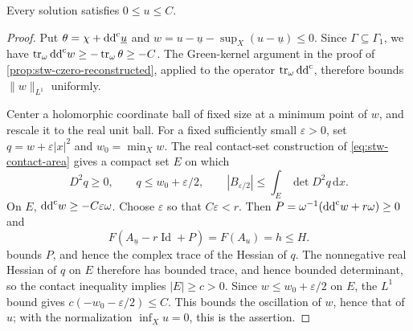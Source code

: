 \begin{proposition}\label{prop:strict-gap-potential-bound}
Every solution satisfies $0\leq u\leq C$.
\end{proposition}
\begin{proof}
Put $\theta=\chi+\mathrm{dd}^{\mathrm{c}}\underline u$ and $w=u-\underline u-\sup_X(u-\underline u)\leq0$. Since $\Gamma\subseteq\Gamma_1$, we have $\operatorname{tr}_\omega\mathrm{dd}^{\mathrm{c}} w\geq-\operatorname{tr}_\omega\theta\geq-C$. The Green-kernel argument in the proof of \cref{prop:stw-czero-reconstructed}, applied to the operator $\operatorname{tr}_\omega\mathrm{dd}^{\mathrm{c}}$, therefore bounds $\|w\|_{L^1}$ uniformly.

Center a holomorphic coordinate ball of fixed size at a minimum point of $w$, and rescale it to the real unit ball. For a fixed sufficiently small $\varepsilon>0$, set $q=w+\varepsilon|x|^2$ and $w_0=\min_Xw$. The real contact-set construction of \eqref{eq:stw-contact-area} gives a compact set $E$ on which
\[
 D^2q\geq0,\qquad q\leq w_0+\varepsilon/2,
 \qquad |B_{\varepsilon/2}|\leq\int_E\det D^2q\,\mathrm dx.
\]
On $E$, $\mathrm{dd}^{\mathrm{c}} w\geq-C\varepsilon\omega$. Choose $\varepsilon$ so that $C\varepsilon<r$. Then $P=\omega^{-1}(\mathrm{dd}^{\mathrm{c}} w+r\omega)\geq0$ and
\[
 F(A_{\underline u}-r\operatorname{Id}+P)=F(A_u)=h\leq H.
\]
 bounds $P$, and hence the complex trace of the Hessian of $q$. The nonnegative real Hessian of $q$ on $E$ therefore has bounded trace, and hence bounded determinant, so the contact inequality implies $|E|\geq c>0$. Since $w\leq w_0+\varepsilon/2$ on $E$, the $L^1$ bound gives $c(-w_0-\varepsilon/2)\leq C$. This bounds the oscillation of $w$, hence that of $u$; with the normalization $\inf_Xu=0$, this is the assertion.
\end{proof}

